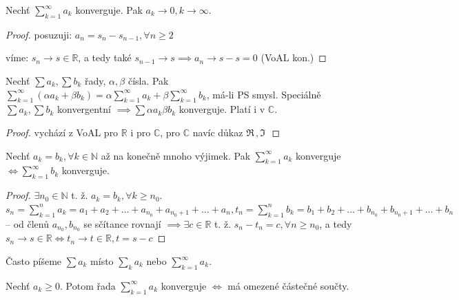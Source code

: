 \begin{veta}\label{10npk}
  Nechť $\sum_{k=1}^{\infty} a_k$ konverguje. Pak $a_k \to 0, k \to \infty$.
\end{veta}

\begin{proof}
  posuzuji: $a_n = s_n - s_{n-1}, \forall n \geq 2$

  víme: $s_n \to s \in \mathbb R$, a tedy také $s_{n-1} \to s \implies a_n \to s-s = 0$ (VoAL kon.)
\end{proof}

\begin{veta}
  Nechť $\sum a_k, \sum b_k$ řady, $\alpha, \beta$ čísla. Pak $\sum_{k=1}^{\infty} (\alpha a_k + \beta b_k) = \alpha \sum_{k=1}^{\infty} a_k + \beta \sum_{k=1}^{\infty} b_k$, má-li PS smysl. Speciálně $\sum a_k, \sum b_k$ konvergentní $\implies \sum \alpha a_k \beta b_k$ konverguje. Platí i v $\mathbb C$.
\end{veta}

\begin{proof}
  vychází z VoAL pro $\mathbb R$ i pro $\mathbb C$, pro $\mathbb C$ navíc důkaz  $\Re \,, \Im \,$
\end{proof}

\begin{lemma}
  Nechť $a_k = b_k, \forall k \in \mathbb N$ až na konečně mnoho výjimek. Pak $\sum_{k=1}^{\infty} a_k$ konverguje $\iff \sum_{k=1}^{\infty} b_k$ konverguje.
\end{lemma}

\begin{proof}
  $\exists n_0 \in \mathbb N$ t. ž. $a_k = b_k, \forall k \geq n_0$. $s_n = \sum_{k=1}^{n} a_k = a_1+a_2+\dots+a_{n_0}+a_{n_0+1}+\dots+a_n, t_n = \sum_{k=1}^{n} b_k = b_1+b_2+\dots+b_{n_0}+b_{n_0+1}+\dots+b_n$ -- od členů $a_{n_0}, b_{n_0}$ se sčítance rovnají $\implies \exists c \in \mathbb R$ t. ž. $s_n-t_n=c, \forall n \geq n_0$, a tedy $s_n \to s \in \mathbb R \iff t_n \to t \in \mathbb R, t = s-c$
\end{proof}

\begin{poznamka}
  Často píšeme $\sum a_k$ místo $\sum_k a_k$ nebo $\sum_{k=1}^{\infty} a_k$.
\end{poznamka}

\begin{lemma}
  Nechť $a_k \geq 0$. Potom řada $\sum_{k=1}^{\infty} a_k$ konverguje $\iff$ má omezené částečné součty.
\end{lemma}

